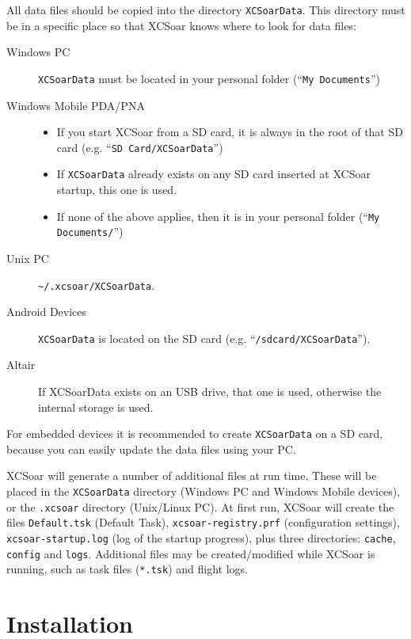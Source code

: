 All data files should be copied into the directory
\texttt{XCSoarData}.  This directory must be in a specific place
so that XCSoar knows where to look for data files:

\begin{description}
\item[Windows PC]
\texttt{XCSoarData} must be located in your personal folder (``\texttt{My
Documents}'')
\item[Windows Mobile PDA/PNA]
\begin{itemize}
\item If you start XCSoar from a SD card, it is always in the root of
  that SD card (e.g. ``\texttt{SD Card/XCSoarData}'')
\item If \texttt{XCSoarData} already exists on any SD card inserted
  at XCSoar start\-up, this one is used.
\item If none of the above applies, then it is in your personal folder
  (``\texttt{My Documents/}'')
\end{itemize}
\item[Unix PC]
\verb|~/.xcsoar/XCSoarData|.
\item[Android Devices]
\texttt{XCSoarData} is located on the SD card (e.g.
``\texttt{/sdcard/XCSoarData}'').
\item[Altair]
If XCSoarData exists on an USB drive, that one is used, otherwise the
internal storage is used.
\end{description}

For embedded devices it is recommended to create \texttt{XCSoarData} on a SD
card, because you can easily update the data files using your PC.


XCSoar will generate a number of additional files at run time.  These
will be placed in the  \texttt{XCSoarData} directory (Windows PC and 
Windows Mobile devices), or the \texttt{.xcsoar} directory (Unix/Linux
PC).  At first run, XCSoar will create the files 
\texttt{Default.tsk} (Default Task),  \texttt{xcsoar-registry.prf} 
(configuration settings), \newline
\texttt{xcsoar-startup.log} (log of the startup progress), 
plus three directories: \texttt{cache},
\texttt{config} and \texttt{logs}.  Additional files may be
created/modified while XCSoar is running, such as task files
(\texttt{*.tsk}) and flight logs.




\section{Installation}


